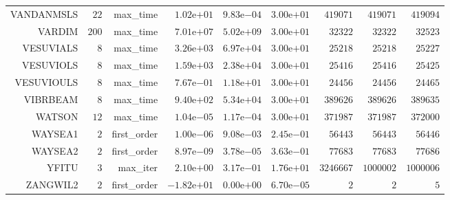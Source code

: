 \begin{longtable}{rrrrrrrrr}
VANDANMSLS & \(    22\) & max\_time & \( 1.02\)e\(+01\) & \( 9.83\)e\(-04\) & \( 3.00\)e\(+01\) & \(419071\) & \(419071\) & \(419094\) \\
VARDIM & \(   200\) & max\_time & \( 7.01\)e\(+07\) & \( 5.02\)e\(+09\) & \( 3.00\)e\(+01\) & \( 32322\) & \( 32322\) & \( 32523\) \\
VESUVIALS & \(     8\) & max\_time & \( 3.26\)e\(+03\) & \( 6.97\)e\(+04\) & \( 3.00\)e\(+01\) & \( 25218\) & \( 25218\) & \( 25227\) \\
VESUVIOLS & \(     8\) & max\_time & \( 1.59\)e\(+03\) & \( 2.38\)e\(+04\) & \( 3.00\)e\(+01\) & \( 25416\) & \( 25416\) & \( 25425\) \\
VESUVIOULS & \(     8\) & max\_time & \( 7.67\)e\(-01\) & \( 1.18\)e\(+01\) & \( 3.00\)e\(+01\) & \( 24456\) & \( 24456\) & \( 24465\) \\
VIBRBEAM & \(     8\) & max\_time & \( 9.40\)e\(+02\) & \( 5.34\)e\(+04\) & \( 3.00\)e\(+01\) & \(389626\) & \(389626\) & \(389635\) \\
WATSON & \(    12\) & max\_time & \( 1.04\)e\(-05\) & \( 1.17\)e\(-04\) & \( 3.00\)e\(+01\) & \(371987\) & \(371987\) & \(372000\) \\
WAYSEA1 & \(     2\) & first\_order & \( 1.00\)e\(-06\) & \( 9.08\)e\(-03\) & \( 2.45\)e\(-01\) & \( 56443\) & \( 56443\) & \( 56446\) \\
WAYSEA2 & \(     2\) & first\_order & \( 8.97\)e\(-09\) & \( 3.78\)e\(-05\) & \( 3.63\)e\(-01\) & \( 77683\) & \( 77683\) & \( 77686\) \\
YFITU & \(     3\) & max\_iter & \( 2.10\)e\(+00\) & \( 3.17\)e\(-01\) & \( 1.76\)e\(+01\) & \(3246667\) & \(1000002\) & \(1000006\) \\
ZANGWIL2 & \(     2\) & first\_order & \(-1.82\)e\(+01\) & \( 0.00\)e\(+00\) & \( 6.70\)e\(-05\) & \(     2\) & \(     2\) & \(     5\) \\\hline
\end{longtable}
